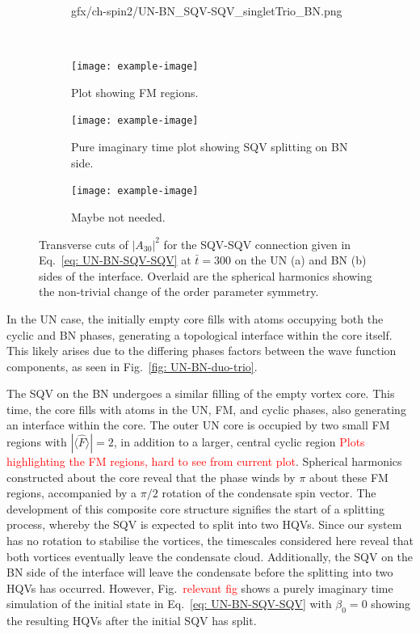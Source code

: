 \begin{figure}
\begin{subfigure}{0.33\textwidth}
        {gfx/ch-spin2/UN-BN_SQV-SQV_singletTrio_BN.png}
        \caption{}
    \end{subfigure}\\
    \begin{subfigure}{0.33\textwidth}
        \texttt{[image: example-image]}
        \caption{Plot showing FM regions.}
    \end{subfigure}
    \begin{subfigure}{0.33\textwidth}
        \texttt{[image: example-image]}
        \caption{Pure imaginary time plot showing SQV splitting on BN side.}
    \end{subfigure}
    \begin{subfigure}{0.33\textwidth}
        \texttt{[image: example-image]}
        \caption{Maybe not needed.}
    \end{subfigure}
    \caption{\label{fig: UN-BN-SQV-SQV-singlets}Transverse cuts of
    \(|A_{30}|^2\) for the SQV-SQV connection given in
    Eq.~\eqref{eq: UN-BN-SQV-SQV} at \(\bar{t} = 300\) on the UN (a) and BN (b)
    sides of the interface.
    Overlaid are the spherical harmonics showing the non-trivial change of the
    order parameter symmetry.}
\end{figure}
In the UN case, the initially empty core fills with atoms occupying both the
cyclic and BN phases, generating a topological interface within the core itself.
This likely arises due to the differing phases factors between the wave function
components, as seen in Fig.~\ref{fig: UN-BN-duo-trio}.

The SQV on the BN undergoes a similar filling of the empty vortex core.
This time, the core fills with atoms in the UN, FM, and cyclic phases, also
generating an interface within the core.
The outer UN core is occupied by two small FM regions with
\(|\langle \hat{F} \rangle| = 2\), in addition to a larger, central cyclic
region \textcolor{red}{Plots highlighting the FM regions, hard to see from
    current plot}.
Spherical harmonics constructed about the core reveal that the phase winds by
\(\pi \) about these FM regions, accompanied by a \(\pi/2\) rotation of the
condensate spin vector.
The development of this composite core structure signifies the start of a
splitting process, whereby the SQV is expected to split into two HQVs.
Since our system has no rotation to stabilise the vortices, the timescales
considered here reveal that both vortices eventually leave the condensate
cloud.
Additionally, the SQV on the BN side of the interface will leave the condensate
before the splitting into two HQVs has occurred.
However, Fig.~\textcolor{red}{relevant fig} shows a purely imaginary time
simulation of the initial state in Eq.~\eqref{eq: UN-BN-SQV-SQV} with
\(\beta_0 = 0\) showing the resulting HQVs after the initial SQV has split.

